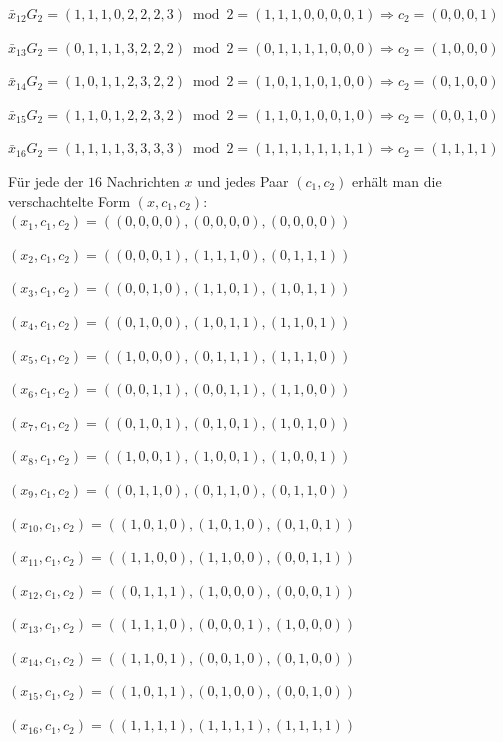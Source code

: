 \begin{Beispiel}
    $\bar{x}_{12}G_2= (1,1,1,0,2,2,2,3) \bmod 2 = (1,1,1,0,0,0,0,1) \Rightarrow c_2= (0,0,0,1)$
    
    $\bar{x}_{13}G_2= (0,1,1,1,3,2,2,2) \bmod 2 = (0,1,1,1,1,0,0,0) \Rightarrow c_2= (1,0,0,0)$
    
    $\bar{x}_{14}G_2= (1,0,1,1,2,3,2,2) \bmod 2 = (1,0,1,1,0,1,0,0) \Rightarrow c_2= (0,1,0,0)$
    
    $\bar{x}_{15}G_2= (1,1,0,1,2,2,3,2) \bmod 2 = (1,1,0,1,0,0,1,0) \Rightarrow c_2= (0,0,1,0)$
    
    $\bar{x}_{16}G_2= (1,1,1,1,3,3,3,3) \bmod 2 = (1,1,1,1,1,1,1,1) \Rightarrow c_2= (1,1,1,1)$\\
    \pagebreak
    
    Für jede der $16$ Nachrichten $x$ und jedes Paar $(c_1,c_2)$ erhält man die verschachtelte Form $(x,c_1,c_2):$\\
    
    $(x_1, c_1, c_2) = ((0,0,0,0), (0,0,0,0), (0,0,0,0))$
    
    $(x_2, c_1, c_2) = ((0,0,0,1), (1,1,1,0), (0,1,1,1))$
    
    $(x_3, c_1, c_2) = ((0,0,1,0), (1,1,0,1), (1,0,1,1))$
    
    $(x_4, c_1, c_2) = ((0,1,0,0), (1,0,1,1), (1,1,0,1))$
    
    $(x_5, c_1, c_2) = ((1,0,0,0), (0,1,1,1), (1,1,1,0))$
    
    $(x_6, c_1, c_2) = ((0,0,1,1), (0,0,1,1), (1,1,0,0))$
    
    $(x_7, c_1, c_2) = ((0,1,0,1), (0,1,0,1), (1,0,1,0))$
    
    $(x_8, c_1, c_2) = ((1,0,0,1), (1,0,0,1), (1,0,0,1))$
    
    $(x_9, c_1, c_2) = ((0,1,1,0), (0,1,1,0), (0,1,1,0))$
    
    $(x_{10}, c_1, c_2) = ((1,0,1,0), (1,0,1,0), (0,1,0,1))$
    
    $(x_{11}, c_1, c_2) = ((1,1,0,0), (1,1,0,0), (0,0,1,1))$
    
    $(x_{12}, c_1, c_2) = ((0,1,1,1), (1,0,0,0), (0,0,0,1))$
    
    $(x_{13}, c_1, c_2) = ((1,1,1,0), (0,0,0,1), (1,0,0,0))$
    
    $(x_{14}, c_1, c_2) = ((1,1,0,1), (0,0,1,0), (0,1,0,0))$
    
    $(x_{15}, c_1, c_2) = ((1,0,1,1), (0,1,0,0), (0,0,1,0))$
    
    $(x_{16}, c_1, c_2) = ((1,1,1,1), (1,1,1,1), (1,1,1,1))$\\
    

\end{Beispiel}
